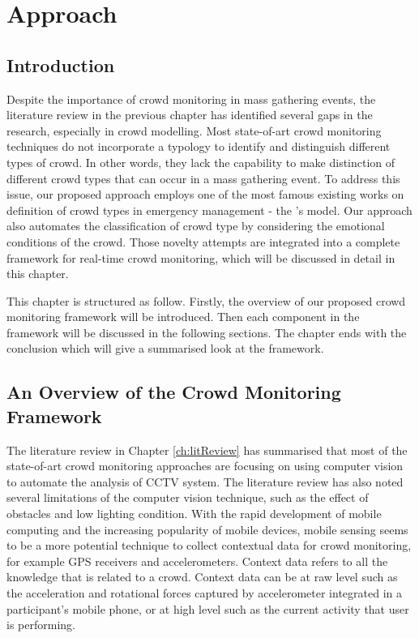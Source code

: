 \chapter{Approach}
\label{ch:approach}
\ifpdf
\graphicspath{{Chapter3/Figs/Raster/}{Chapter3/Figs/PDF/}{Chapter3/Figs/}}
\else
\graphicspath{{Chapter3/Figs/Vector/}{Chapter3/Figs/}}
\fi

\section{Introduction}
\label{sec:approachIntro}
Despite the importance of crowd monitoring in mass gathering events, the literature review in the previous chapter has identified several gaps in the research, especially in crowd modelling. Most state-of-art crowd monitoring techniques do not incorporate a typology to identify and distinguish different types of crowd. In other words, they lack the capability to make distinction of different crowd types that can occur in a mass gathering event. To address this issue, our proposed approach employs one of the most famous existing works on definition of crowd types in emergency management - the \citet{Berlonghi1995}'s model. Our approach also automates the classification of crowd type by considering the emotional conditions of the crowd. Those novelty attempts are integrated into a complete framework for real-time crowd monitoring, which will be discussed in detail in this chapter.

This chapter is structured as follow. Firstly, the overview of our proposed crowd monitoring framework will be introduced. Then each component in the framework will be discussed in the following sections. The chapter ends with the conclusion which will give a summarised look at the framework.

\section{An Overview of the Crowd Monitoring Framework}

The literature review in Chapter \ref{ch:litReview} has summarised that most of the state-of-art crowd monitoring approaches are focusing on using computer vision to automate the analysis of CCTV system. The literature review has also noted several limitations of the computer vision technique, such as the effect of obstacles and low lighting condition. With the rapid development of mobile computing and the increasing popularity of mobile devices, mobile sensing seems to be a more potential technique to collect contextual data for crowd monitoring, for example GPS receivers and accelerometers. Context data refers to all the knowledge that is related to a crowd. Context data can be at raw level such as the acceleration and rotational forces captured by accelerometer integrated in a participant's mobile phone, or at high level such as the current activity that user is performing.

